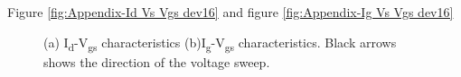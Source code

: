 \documentclass[11pt,a4paper]{report}
\begin{document}
Figure \ref{fig:Appendix-Id Vs Vgs dev16} and figure \ref{fig:Appendix-Ig Vs Vgs dev16}
\begin{figure}
    \begin{minipage}{.5\linewidth}
    \centering
    \end{minipage}
    \begin{minipage}{.5\linewidth}
    \centering
    
    \end{minipage}\par\medskip
    \caption{(a) I\textsubscript{d}-V\textsubscript{gs} characteristics (b)I\textsubscript{g}-V\textsubscript{gs} characteristics. Black arrows shows the direction of the voltage sweep.}
    \label{fig:Appendix-Vgs Sweep}
\end{figure}
\end{document}
